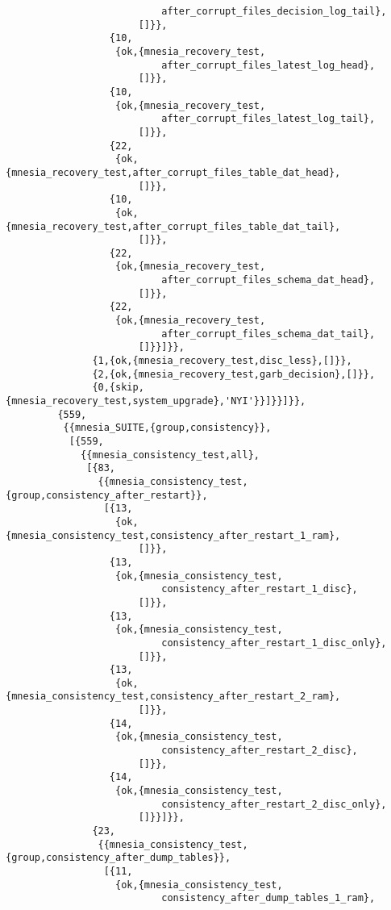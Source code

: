 \begin{verbatim}
                           after_corrupt_files_decision_log_tail},
                       []}},
                  {10,
                   {ok,{mnesia_recovery_test,
                           after_corrupt_files_latest_log_head},
                       []}},
                  {10,
                   {ok,{mnesia_recovery_test,
                           after_corrupt_files_latest_log_tail},
                       []}},
                  {22,
                   {ok,{mnesia_recovery_test,after_corrupt_files_table_dat_head},
                       []}},
                  {10,
                   {ok,{mnesia_recovery_test,after_corrupt_files_table_dat_tail},
                       []}},
                  {22,
                   {ok,{mnesia_recovery_test,
                           after_corrupt_files_schema_dat_head},
                       []}},
                  {22,
                   {ok,{mnesia_recovery_test,
                           after_corrupt_files_schema_dat_tail},
                       []}}]}},
               {1,{ok,{mnesia_recovery_test,disc_less},[]}},
               {2,{ok,{mnesia_recovery_test,garb_decision},[]}},
               {0,{skip,{mnesia_recovery_test,system_upgrade},'NYI'}}]}}]}},
         {559,
          {{mnesia_SUITE,{group,consistency}},
           [{559,
             {{mnesia_consistency_test,all},
              [{83,
                {{mnesia_consistency_test,{group,consistency_after_restart}},
                 [{13,
                   {ok,{mnesia_consistency_test,consistency_after_restart_1_ram},
                       []}},
                  {13,
                   {ok,{mnesia_consistency_test,
                           consistency_after_restart_1_disc},
                       []}},
                  {13,
                   {ok,{mnesia_consistency_test,
                           consistency_after_restart_1_disc_only},
                       []}},
                  {13,
                   {ok,{mnesia_consistency_test,consistency_after_restart_2_ram},
                       []}},
                  {14,
                   {ok,{mnesia_consistency_test,
                           consistency_after_restart_2_disc},
                       []}},
                  {14,
                   {ok,{mnesia_consistency_test,
                           consistency_after_restart_2_disc_only},
                       []}}]}},
               {23,
                {{mnesia_consistency_test,{group,consistency_after_dump_tables}},
                 [{11,
                   {ok,{mnesia_consistency_test,
                           consistency_after_dump_tables_1_ram},

\end{verbatim}
